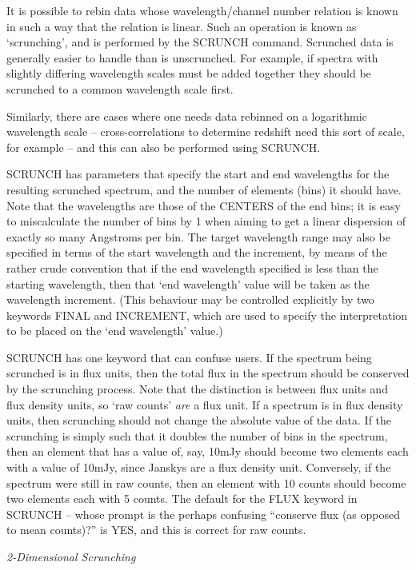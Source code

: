 It is possible to rebin data whose wavelength/channel number relation
is known in such a way that the relation is linear.  Such an operation is
known as `scrunching', and is performed by the SCRUNCH command.  
Scrunched data is generally easier to handle than is unscrunched.  For
example, if spectra
with slightly differing wavelength scales must be added together they should
be scrunched to a common wavelength scale first.  

Similarly, there are cases where one needs data rebinned on a 
logarithmic wavelength scale -- cross-correlations to determine redshift need
this sort of scale, for example -- and this can also be performed using
SCRUNCH.

SCRUNCH has parameters that specify the start and end wavelengths for
the resulting scrunched spectrum, and the number of elements (bins) it should
have.  Note that the wavelengths are those of the CENTERS of the end bins;
it is easy to miscalculate the number of bins by 1 when aiming to get a
linear dispersion of exactly so many Angstroms per bin.  The target wavelength
range may also be specified in terms of the start wavelength and the increment,
by means of the rather crude convention that if the end wavelength specified
is less than the starting wavelength, then that `end wavelength' value will
be taken as the wavelength increment.  (This behaviour may be controlled
explicitly by two keywords FINAL and INCREMENT, which are used to specify the
interpretation to be placed on the `end wavelength' value.)

SCRUNCH has one keyword that can confuse users.  If the spectrum being
scrunched is in flux units, then the total flux in the spectrum should be
conserved by the scrunching process.  Note that the distinction is between
flux units and flux density units, so `raw counts' {\it are} a flux unit.
If a spectrum is in flux density units, then scrunching should not change
the absolute value of the data.  If the scrunching is simply such that it
doubles the number of bins in the spectrum, then an element that has a value
of, say, 10mJy should become two elements each with a value of 10mJy, since
Janskys are a flux density unit.  Conversely, if the spectrum were still in
raw counts, then an element with 10 counts should become two elements each
with 5 counts.  The default for the FLUX keyword in SCRUNCH -- whose prompt
is the perhaps confusing ``conserve flux (as opposed to mean counts)?'' is
YES, and this is correct for raw counts.


\goodbreak
\vspace{12pt}
{\it 2-Dimensional Scrunching}

